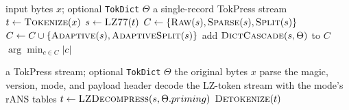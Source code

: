 \documentclass[10pt,twocolumn]{article}
\theoremstyle{plain}
\theoremstyle{definition}
\begin{document}
\begin{algorithm}[t]
\caption{TokPress encode}
\label{alg:encode}
\begin{algorithmic}[1]
\Require input bytes $x$; optional \texttt{TokDict} $\Theta$
\Ensure a single-record TokPress stream
\State $t \gets \Call{Tokenize}{x}$ 
\State $s \gets \Call{LZ77}{t}$ 
\State $C \gets \{\Call{Raw}{s}, \Call{Sparse}{s}, \Call{Split}{s}\}$
\State $C \gets C \cup \{\Call{Adaptive}{s}, \Call{AdaptiveSplit}{s}\}$
    \State add $\Call{DictCascade}{s, \Theta}$ to $C$ 
\EndIf
\State \Return $\arg\min_{c \in C} |c|$ 
\end{algorithmic}
\end{algorithm}

\begin{algorithm}[t]
\caption{TokPress decode}
\label{alg:decode}
\begin{algorithmic}[1]
\Require a TokPress stream; optional \texttt{TokDict} $\Theta$
\Ensure the original bytes $x$
\State parse the magic, version, mode, and payload header
\State decode the LZ-token stream with the mode's rANS tables 
\State $t \gets \Call{LZDecompress}{s, \Theta.priming}$
\State \Return $\Call{Detokenize}{t}$
\end{algorithmic}
\end{algorithm}
\end{document}

